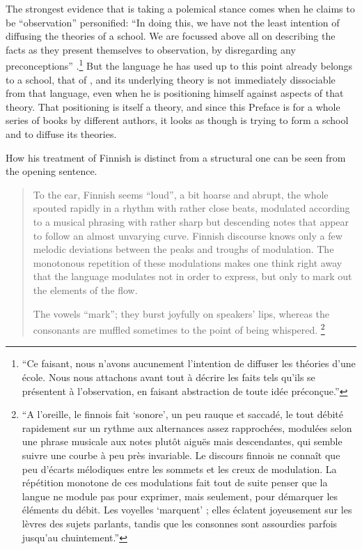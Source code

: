 \documentclass[output=paper]{langscibook}
\begin{document}
The strongest evidence that {\Sauvageot} is taking a polemical stance comes when he claims to be ``observation'' personified: ``In doing this, we have not the least intention of diffusing the theories of a school. We are focussed above all on describing the facts as they present themselves to observation, by disregarding any preconceptions'' \citep[7--8]{Sauvageot1946}.\footnote{``Ce faisant, nous n'avons aucunement l'intention de diffuser les théories d'une école. Nous nous attachons avant tout à décrire les faits tels qu'ils se présentent à l'observation, en faisant abstraction de toute idée préconçue.''} But the language he has used up to this point already belongs to a school, that of , and its underlying theory is not immediately dissociable from that language, even when he is positioning himself against aspects of that theory. That positioning is itself a theory, and since this Preface is for a whole series of books by different authors, it looks as though {\Sauvageot} is trying to form a school and to diffuse its theories.

\largerpage
How his treatment of Finnish is distinct from a structural one can be seen from the opening sentence. 

\begin{quote}
To the ear, Finnish seems ``loud'', a bit hoarse and abrupt, the whole spouted rapidly in a rhythm with rather close beats, modulated according to a musical phrasing with rather sharp but descending notes that appear to follow an almost unvarying curve. Finnish discourse knows only a few melodic deviations between the peaks and troughs of modulation. The monotonous repetition of these modulations makes one think right away that the language modulates not in order to express, but only to mark out the elements of the flow.


The vowels ``mark''; they burst joyfully on speakers' lips, whereas the consonants are muffled sometimes to the point of being whispered. \citep[15]{Sauvageot1946}\footnote{``A l'oreille, le finnois fait `sonore', un peu rauque et saccadé, le tout débité rapidement sur un rythme aux alternances assez rapprochées, modulées selon une phrase musicale aux notes plutôt aiguës mais descendantes, qui semble suivre une courbe à peu près invariable. Le discours finnois ne connaît que peu d'écarts mélodiques entre les sommets et les creux de modulation. La répétition monotone de ces modulations fait tout de suite penser que la langue ne module pas pour exprimer, mais seulement, pour démarquer les éléments du débit. Les voyelles `marquent' ; elles éclatent joyeusement sur les lèvres des sujets parlants, tandis que les consonnes sont assourdies parfois jusqu'au chuintement.''}
\end{quote}
\end{document}
